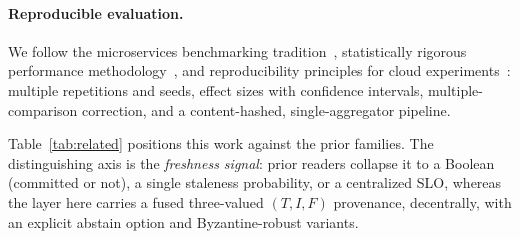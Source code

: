 \documentclass[11pt]{article}
\begin{document}
\paragraph{Reproducible evaluation.} We follow the microservices benchmarking
tradition~\cite{gan2019deathstarbench,zhou2021trainticket}, statistically rigorous performance
methodology~\cite{georges2007rigorous}, and reproducibility principles for cloud
experiments~\cite{papadopoulos2021reproducible}: multiple repetitions and seeds, effect sizes with
confidence intervals, multiple-comparison correction, and a content-hashed, single-aggregator
pipeline.

Table~\ref{tab:related} positions this work against the prior families. The distinguishing axis is the
\emph{freshness signal}: prior readers collapse it to a Boolean (committed or not), a single staleness
probability, or a centralized SLO, whereas the layer here carries a fused three-valued
$(T,I,F)$ provenance, decentrally, with an explicit abstain option and Byzantine-robust variants.

\begin{table}[t]
\centering
\caption{Where the neutrosophic freshness layer sits relative to prior approaches to global-state
reads. ``Abstain'' = can decline to act under uncertainty; ``Decentralized'' = no coordinating leader.}
\label{tab:related}
\small
{}
\end{table}
\end{document}
